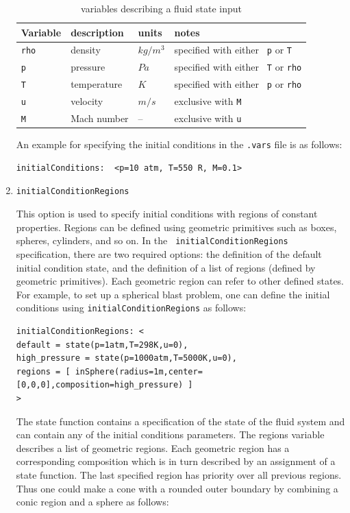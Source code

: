 \documentclass{article}
\begin{document}
\begin{enumerate}
\begin{table}[htbp]
  \begin{centering}
    \leavevmode
  \begin{tabular}{|l|l|l|l|}
    \hline
    Variable & description & units & notes \\
    \hline\hline
    {\tt rho}      & density     & $kg/m^3$ & specified with either {\tt
    p} or {\tt T} \\
    {\tt p}        & pressure    & $Pa$     & specified with either {\tt
    T}  or {\tt rho} \\
    {\tt T}        & temperature & $K$      & specified with either {\tt
    p}  or {\tt rho} \\
    {\tt u}        & velocity    & $m/s$    & exclusive with {\tt M} \\
    {\tt M}        & Mach number &  --    & exclusive with {\tt u} \\
    \hline
  \end{tabular}
\caption{variables describing a fluid state input}
  \label{tab:fs}
  \end{centering}
\end{table}

An example for specifying the initial conditions in the {\tt .vars} file is as follows:

\begin{verbatim}
initialConditions:  <p=10 atm, T=550 R, M=0.1>
\end{verbatim}

\item {\tt initialConditionRegions}

This option is used to specify initial conditions with regions of
constant properties.  Regions can be defined using geometric
primitives such as boxes, spheres, cylinders, and so on. In the {\tt
  initialConditionRegions } specification, there are two required
options: the definition of the default initial condition state, and
the definition of a list of regions (defined by geometric
primitives).  Each geometric region can refer to other defined
states.  For example, to set up a spherical blast problem, one can
define the initial conditions using {\tt initialConditionRegions} as
follows:

\begin{verbatim}
initialConditionRegions: < 
default = state(p=1atm,T=298K,u=0),
high_pressure = state(p=1000atm,T=5000K,u=0),
regions = [ inSphere(radius=1m,center=[0,0,0],composition=high_pressure) ]
>
\end{verbatim}

The state function contains a specification of the state of the fluid
system and can contain any of the initial conditions parameters.
The regions variable describes a list of
geometric regions.  Each geometric region has a corresponding
composition which is in turn described by an assignment of a state
function.  The last specified region has priority over all previous regions.
Thus one could make a cone with a rounded outer boundary by combining
a conic region and a sphere as follows:


\end{enumerate}
\end{document}
